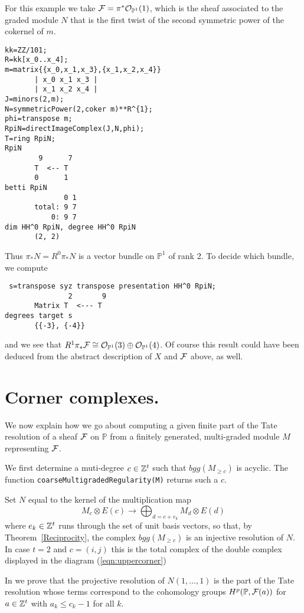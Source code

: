 \documentclass[twoside,12pt, leqno]{amsart}
\def\PP{{\mathbb P}}
\def\P{{\mathbb P}}
\begin{document}
For this example we take $\sF = \pi^*\sO_{\PP^1}(1)$, which is the sheaf associated to the
graded module
$N$ that is the first twist of the second symmetric power of the cokernel 
of $m$.
{\small\begin{verbatim}
kk=ZZ/101;
R=kk[x_0..x_4];
m=matrix{{x_0,x_1,x_3},{x_1,x_2,x_4}}
       | x_0 x_1 x_3 |
       | x_1 x_2 x_4 |
J=minors(2,m);
N=symmetricPower(2,coker m)**R^{1};
phi=transpose m;
RpiN=directImageComplex(J,N,phi);
T=ring RpiN;
RpiN
        9      7
       T  <-- T               
       0      1
betti RpiN
              0 1
       total: 9 7
           0: 9 7
dim HH^0 RpiN, degree HH^0 RpiN
       (2, 2)
\end{verbatim}
\noindent Thus $\pi_*N = R^0\pi_*N$ is a vector bundle on $\P^1$ of rank 2.
To decide which bundle, we compute
\begin{verbatim}
 s=transpose syz transpose presentation HH^0 RpiN;
               2       9
       Matrix T  <--- T
degrees target s
       {{-3}, {-4}} 
\end{verbatim} }
\noindent and we see that $R^1\pi_* \sF \cong \sO_{\PP^1}(3) \oplus \sO_{\PP^1}(4)$.
Of course this result could have been deduced from the abstract description of $X$ and ${\mathcal F}$
above, as well.

\section{Corner complexes.}\label{sec:cornercomplex}

We now explain how we go about computing a given finite part of the Tate resolution
of a sheaf ${\mathcal F}$ on $\PP$ from a finitely generated, multi-graded module $M$
representing ${\mathcal F}$.

We first determine a muti-degree $c \in {\mathbb Z}^t$ such that $bgg(M_{ \ge c})$ is acyclic.
The function {\tt coarseMultigradedRegularity(M)} returns such a $c$.

Set $N$ equal to the kernel of the multiplication map
$$ 
M_c \otimes E(c) \to \bigoplus_{d=c+e_k}M_{d} \otimes E(d) 
$$
where $e_k \in {\mathbb Z}^t$ runs through the set of unit basis vectors,
so that, by Theorem~\ref{Reciprocity}, the complex $bgg(M_{\ge c})$ is an injective resolution of $N$.
In case $t=2$ and $c=(i,j)$ this is the total complex of the double complex displayed in the diagram (\ref{eqn:uppercorner})
 
In \cite{EES} we prove that
the projective resolution of $N(1,\ldots,1)$ is the part of the Tate resolution whose terms correspond to the cohomology groups
$H^p(\PP, \sF(a))$ for  $a \in {\mathbb Z}^t$ with $a_k\le c_k -1$ for all $k$. 
\end{document}

